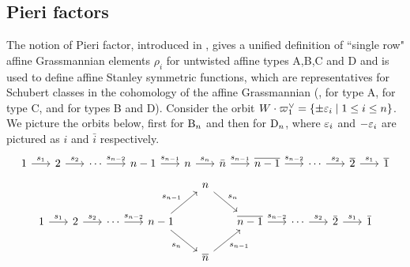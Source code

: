 \documentclass[a4paper]{amsart}
\theoremstyle{remark}
\numberwithin{equation}{section}
\begin{document}
\subsection{Pieri factors}
The notion of Pieri factor, introduced in \cite{Pon}, gives a unified definition of ``single row" affine Grassmannian elements $\rho_i$ for untwisted affine types A,B,C and D and is used to define affine Stanley symmetric functions, which are representatives for Schubert classes in the cohomology of the affine Grassmannian (\cite{LM:ktab}, \cite{Lam:as}
for type A, \cite{LSS:C} for type C, and \cite{Pon} for types B and D). Consider the orbit $W\cdot \varpi_1^\lor = \{ \pm \varepsilon_i \mid 1\le i\le n\}$.
We picture the orbits below, first for $\mathrm{B}_{n}$ and then for $\mathrm{D}_{n}$, where $\varepsilon_i$ and $-\varepsilon_i$ are pictured as $i$ and $\bar{i}$ respectively.
\[
\begin{tikzcd}[column sep=6mm]
 1 \arrow[r,"s_1"] & 2 \arrow[r,"s_2"] & \dotsm \arrow[r,"s_{n-2}"] & n-1 \arrow[r,"s_{n-1}"] & n \arrow[r,"s_n"] & \bar{n} \arrow[r,"s_{n-1}"] & \ba{n-1} \arrow[r,"s_{n-2}"] & \dotsm \arrow[r,"s_2"] & \ba{2} \arrow[r,"s_1"] & \ba{1} 
 \end{tikzcd}
\]
\[
\begin{tikzcd}[column sep = 6mm]
&&&& n \arrow[dr,"s_n"] \\
  1 \arrow[r,"s_1"] & 2 \arrow[r,"s_2"] & \dotsm \arrow[r,"s_{n-2}"] & n-1 \arrow[ur,"s_{n-1}"] \arrow[dr,swap,"s_n"] && \ba{n-1} \arrow[r,"s_{n-2}"] & \dotsm \arrow[r,"s_2"]& \bar{2} \arrow[r,"s_1"] & \bar{1} \\
  &&&& \ba{n} \arrow[ur,swap,"s_{n-1}"]
\end{tikzcd}
\]
\end{document}
